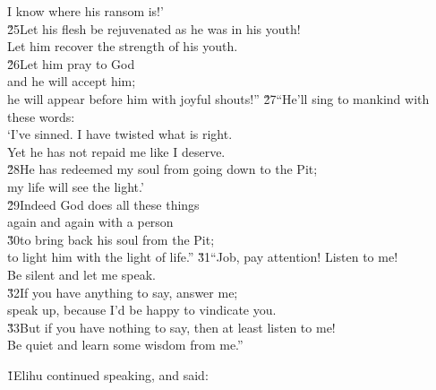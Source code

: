 \begin{poetry}
\poemlll       I know where his ransom is!' \\
\poeml \v{25}Let his flesh be rejuvenated as he was in his youth! \\
\poemll    Let him recover the strength of his youth. \\
\poeml \v{26}Let him pray to God \\
\poemll    and he will accept him; \\
\poemlll       he will appear before him with joyful shouts!''
\poeml \v{27}``He'll sing to mankind with these words: \\
\poeml `I've sinned. I have twisted what is right. \\
\poemll    Yet he has not repaid me like I deserve. \\
\poeml \v{28}He has redeemed my soul from going down to the Pit; \\
\poemll    my life will see the light.' \\
\poeml \v{29}Indeed God does all these things \\
\poemll    again and again with a person \\
\poeml \v{30}to bring back his soul from the Pit; \\
\poemll    to light him with the light of life.''
\poeml \v{31}``Job, pay attention! Listen to me! \\
\poemll    Be silent and let me speak. \\
\poeml \v{32}If you have anything to say, answer me; \\
\poemll    speak up, because I'd be happy to vindicate you. \\
\poeml \v{33}But if you have nothing to say, then at least listen to me! \\
\poemll    Be quiet and learn some wisdom from me.''
\end{poetry}

\v{1}Elihu continued speaking, and said:

